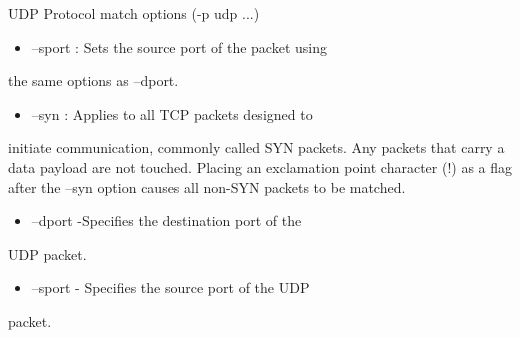 \begin{frame}[t,allowframebreaks]{UDP Protocol match options (-p udp ...)}
  \fontsize{15}{18}\selectfont
  \begin{itemize}
    \item --sport : Sets the source port of the packet using
  \end{itemize}
  the same options as --dport.\par
  \begin{itemize}
    \item --syn : Applies to all TCP packets designed to
  \end{itemize}
  initiate communication, commonly called SYN packets. Any packets that carry a data payload are not touched. Placing an exclamation point character (!) as a flag after the --syn option causes all non-SYN packets to be matched.\par
  \begin{itemize}
    \item --dport -Specifies the destination port of the
  \end{itemize}
  UDP packet.\par
  \begin{itemize}
    \item --sport - Specifies the source port of the UDP
  \end{itemize}
  packet.\par
\end{frame}
